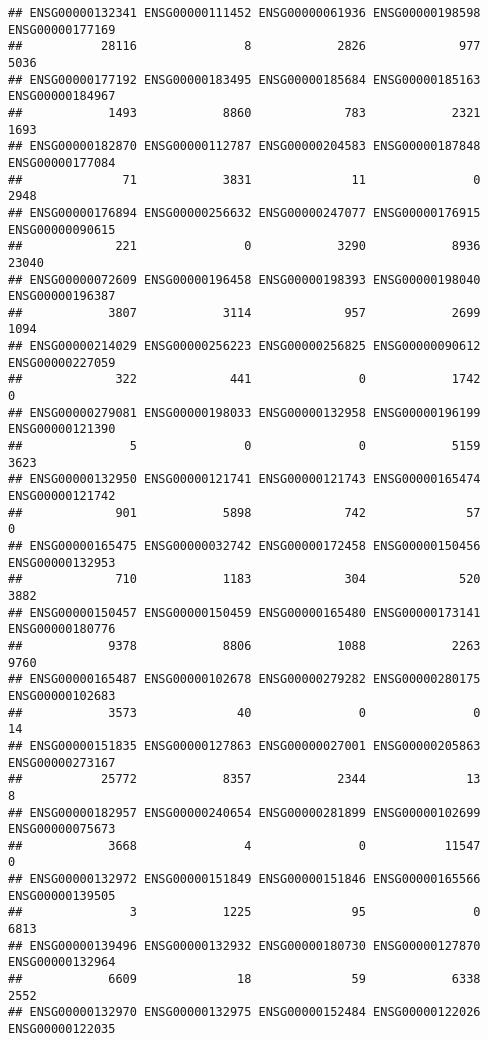 \documentclass[
]{article}
\begin{document}
\begin{verbatim}
## ENSG00000132341 ENSG00000111452 ENSG00000061936 ENSG00000198598 ENSG00000177169 
##           28116               8            2826             977            5036 
## ENSG00000177192 ENSG00000183495 ENSG00000185684 ENSG00000185163 ENSG00000184967 
##            1493            8860             783            2321            1693 
## ENSG00000182870 ENSG00000112787 ENSG00000204583 ENSG00000187848 ENSG00000177084 
##              71            3831              11               0            2948 
## ENSG00000176894 ENSG00000256632 ENSG00000247077 ENSG00000176915 ENSG00000090615 
##             221               0            3290            8936           23040 
## ENSG00000072609 ENSG00000196458 ENSG00000198393 ENSG00000198040 ENSG00000196387 
##            3807            3114             957            2699            1094 
## ENSG00000214029 ENSG00000256223 ENSG00000256825 ENSG00000090612 ENSG00000227059 
##             322             441               0            1742               0 
## ENSG00000279081 ENSG00000198033 ENSG00000132958 ENSG00000196199 ENSG00000121390 
##               5               0               0            5159            3623 
## ENSG00000132950 ENSG00000121741 ENSG00000121743 ENSG00000165474 ENSG00000121742 
##             901            5898             742              57               0 
## ENSG00000165475 ENSG00000032742 ENSG00000172458 ENSG00000150456 ENSG00000132953 
##             710            1183             304             520            3882 
## ENSG00000150457 ENSG00000150459 ENSG00000165480 ENSG00000173141 ENSG00000180776 
##            9378            8806            1088            2263            9760 
## ENSG00000165487 ENSG00000102678 ENSG00000279282 ENSG00000280175 ENSG00000102683 
##            3573              40               0               0              14 
## ENSG00000151835 ENSG00000127863 ENSG00000027001 ENSG00000205863 ENSG00000273167 
##           25772            8357            2344              13               8 
## ENSG00000182957 ENSG00000240654 ENSG00000281899 ENSG00000102699 ENSG00000075673 
##            3668               4               0           11547               0 
## ENSG00000132972 ENSG00000151849 ENSG00000151846 ENSG00000165566 ENSG00000139505 
##               3            1225              95               0            6813 
## ENSG00000139496 ENSG00000132932 ENSG00000180730 ENSG00000127870 ENSG00000132964 
##            6609              18              59            6338            2552 
## ENSG00000132970 ENSG00000132975 ENSG00000152484 ENSG00000122026 ENSG00000122035 

\end{verbatim}
\end{document}
